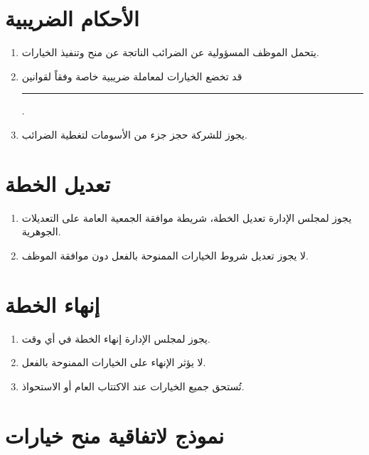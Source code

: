 \documentclass[11pt,a4paper]{article}
\begin{document}
\section{الأحكام الضريبية}
\label{sec:tax}
\begin{enumerate}
    \item يتحمل الموظف المسؤولية عن الضرائب الناتجة عن منح وتنفيذ الخيارات.
    \item قد تخضع الخيارات لمعاملة ضريبية خاصة وفقاً لقوانين \rule{4cm}{0.4pt}.
    \item يجوز للشركة حجز جزء من الأسومات لتغطية الضرائب.
\end{enumerate}

\section{تعديل الخطة}
\label{sec:amendment}
\begin{enumerate}
    \item يجوز لمجلس الإدارة تعديل الخطة، شريطة موافقة الجمعية العامة على التعديلات الجوهرية.
    \item لا يجوز تعديل شروط الخيارات الممنوحة بالفعل دون موافقة الموظف.
\end{enumerate}

\section{إنهاء الخطة}
\label{sec:termination}
\begin{enumerate}
    \item يجوز لمجلس الإدارة إنهاء الخطة في أي وقت.
    \item لا يؤثر الإنهاء على الخيارات الممنوحة بالفعل.
    \item تُستحق جميع الخيارات عند الاكتتاب العام أو الاستحواذ.
\end{enumerate}

\section{نموذج لاتفاقية منح خيارات}
\label{sec:sample}
\end{document}
